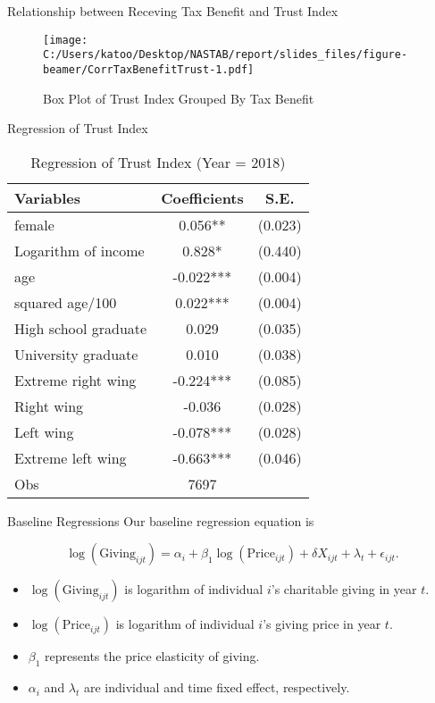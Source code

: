 \documentclass[
  ignorenonframetext,
]{beamer}
\providecommand{\tightlist}{%
  \setlength{\itemsep}{0pt}\setlength{\parskip}{0pt}}
\begin{document}
\begin{frame}{Relationship between Receving Tax Benefit and Trust Index}
\protect\hypertarget{relationship-between-receving-tax-benefit-and-trust-index}{}
\begin{figure}
\centering
\texttt{[image: C:/Users/katoo/Desktop/NASTAB/report/slides\_files/figure-beamer/CorrTaxBenefitTrust-1.pdf]}
\caption{Box Plot of Trust Index Grouped By Tax Benefit}
\end{figure}
\end{frame}

\begin{frame}{Regression of Trust Index}
\protect\hypertarget{regression-of-trust-index}{}
\begin{table}

\caption{\label{tab:kableTabTrustReg}Regression of Trust Index (Year = 2018)}
\centering
\begin{tabular}[t]{lcc}
\toprule
Variables & Coefficients & S.E.\\
\midrule
female & 0.056** & (0.023)\\
Logarithm of income & 0.828* & (0.440)\\
age & -0.022*** & (0.004)\\
squared age/100 & 0.022*** & (0.004)\\
High school graduate & 0.029 & (0.035)\\
University graduate & 0.010 & (0.038)\\
Extreme right wing & -0.224*** & (0.085)\\
Right wing & -0.036 & (0.028)\\
Left wing & -0.078*** & (0.028)\\
Extreme left wing & -0.663*** & (0.046)\\
Obs & 7697 & \\
\bottomrule
\end{tabular}
\end{table}
\end{frame}

\begin{frame}{Baseline Regressions}
\protect\hypertarget{baseline-regressions}{}
Our baseline regression equation is

\[
    \log(\text{Giving}_{ijt}) = 
    \alpha_i + \beta_1 \log(\text{Price}_{ijt}) + \delta X_{ijt} + \lambda_t + \epsilon_{ijt}.
\]

\begin{itemize}
\tightlist
\item
  \(\log(\text{Giving}_{ijt})\) is logarithm of individual \(i\)'s
  charitable giving in year \(t\).
\item
  \(\log(\text{Price}_{ijt})\) is logarithm of individual \(i\)'s giving
  price in year \(t\).
\item
  \(\beta_1\) represents the price elasticity of giving.
\item
  \(\alpha_i\) and \(\lambda_t\) are individual and time fixed effect,
  respectively.
\end{itemize}
\end{frame}
\end{document}
